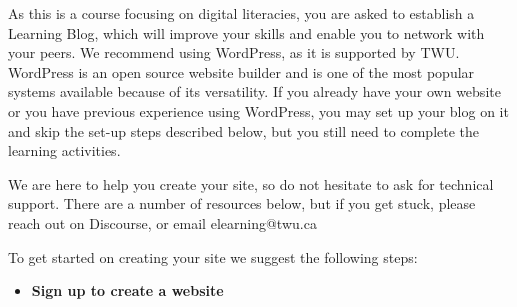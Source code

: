 \documentclass[
  letterpaper,
  DIV=11,
  numbers=noendperiod]{scrreprt}
\providecommand{\tightlist}{%
  \setlength{\itemsep}{0pt}\setlength{\parskip}{0pt}}\usepackage{longtable,booktabs,array}
\begin{document}
\begin{tcolorbox}[enhanced jigsaw, toprule=.15mm, colback=white, colframe=quarto-callout-note-color-frame, bottomtitle=1mm, leftrule=.75mm, coltitle=black, titlerule=0mm, rightrule=.15mm, colbacktitle=quarto-callout-note-color!10!white, left=2mm, title={Learning Activity}, opacitybacktitle=0.6, opacityback=0, breakable, toptitle=1mm, arc=.35mm, bottomrule=.15mm]

As this is a course focusing on digital literacies, you are asked to
establish a Learning Blog, which will improve your skills and enable you
to network with your peers. We recommend using WordPress, as it is
supported by TWU. WordPress is an open source website builder and is one
of the most popular systems available because of its versatility. If you
already have your own website or you have previous experience using
WordPress, you may set up your blog on it and skip the set-up steps
described below, but you still need to complete the learning activities.

We are here to help you create your site, so do not hesitate to ask for
technical support. There are a number of resources below, but if you get
stuck, please reach out on Discourse, or email elearning@twu.ca

To get started on creating your site we suggest the following steps:

\begin{itemize}
\tightlist
\item
  \textbf{Sign up to create a website}


\end{itemize}
\end{tcolorbox}
\end{document}
